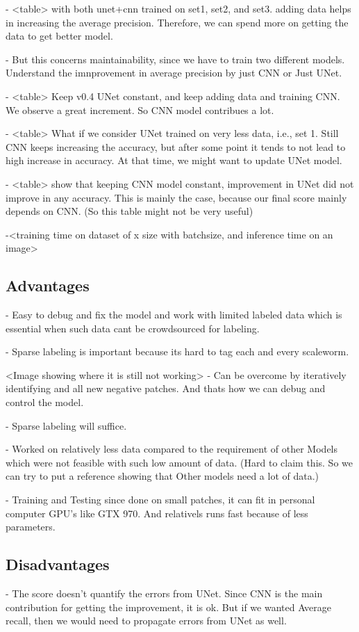 \documentclass[10pt,twocolumn,letterpaper]{article}
\begin{document}
- <table> with both unet+cnn trained on set1, set2, and set3. adding data helps in increasing the average precision. Therefore, we can spend more on getting the data to get better model.

- But this concerns maintainability, since we have to train two different models. Understand the imnprovement in average precision by just CNN or Just UNet. 

- <table> Keep v0.4 UNet constant, and keep adding data and training CNN. We observe a great increment. So CNN model contribues a lot.

- <table> What if we consider UNet trained on very less data, i.e., set 1. Still CNN keeps increasing the accuracy, but after some point it tends to not lead to high increase in accuracy. At that time, we might want to update UNet model.

- <table> show that keeping CNN model constant, improvement in UNet did not improve in any accuracy. This is mainly the case, because our final score mainly depends on CNN. (So this table might not be very useful)

-<training time on dataset of x size with batchsize, and inference time on an image>

\subsection{Advantages}

- Easy to debug and fix the model and work with limited labeled data which is essential when such data cant be crowdsourced for labeling.

- Sparse labeling is important because its hard to tag each and every scaleworm.

<Image showing where it is still not working>
- Can be overcome by iteratively identifying and all new negative patches. And thats how we can debug and control the model.

- Sparse labeling will suffice.

- Worked on relatively less data compared to the requirement of other Models which were not feasible with such low amount of data. (Hard to claim this. So we can try to put a reference showing that Other models need a lot of data.)

- Training and Testing since done on small patches, it can fit in personal computer GPU's like GTX 970. And relativels runs fast because of less parameters.

\subsection{Disadvantages}
- The score doesn't quantify the errors from UNet. Since CNN is the main contribution for getting the improvement, it is ok. But if we wanted Average recall, then we would need to propagate errors from UNet as well.
\end{document}
